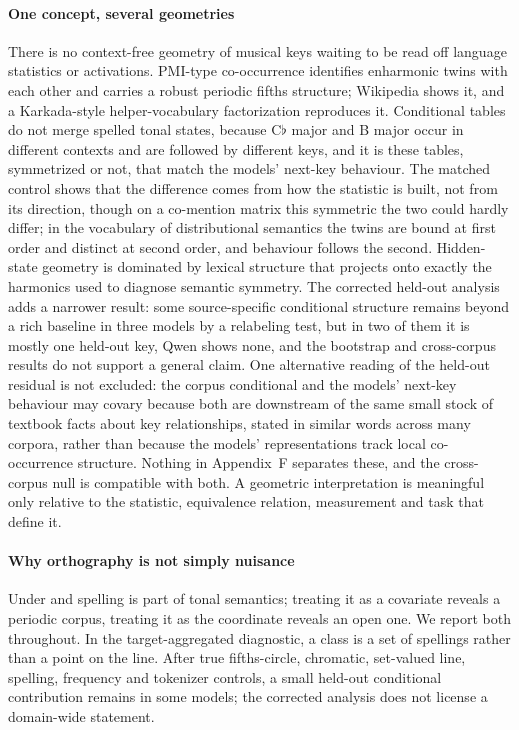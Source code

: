\documentclass[11pt]{article}
\newcommand{\fl}{$\flat$}
\begin{document}
\paragraph{One concept, several geometries} There is no context-free geometry of musical keys waiting to be read off language statistics or activations. PMI-type co-occurrence identifies enharmonic twins with each other and carries a robust periodic fifths structure; Wikipedia shows it, and a Karkada-style helper-vocabulary factorization reproduces it. Conditional tables do not merge spelled tonal states, because C\fl{} major and B major occur in different contexts and are followed by different keys, and it is these tables, symmetrized or not, that match the models' next-key behaviour. The matched control shows that the difference comes from how the statistic is built, not from its direction, though on a co-mention matrix this symmetric the two could hardly differ; in the vocabulary of distributional semantics the twins are bound at first order and distinct at second order, and behaviour follows the second. Hidden-state geometry is dominated by lexical structure that projects onto exactly the harmonics used to diagnose semantic symmetry. The corrected held-out analysis adds a narrower result: some source-specific conditional structure remains beyond a rich baseline in three models by a relabeling test, but in two of them it is mostly one held-out key, Qwen shows none, and the bootstrap and cross-corpus results do not support a general claim. One alternative reading of the held-out residual is not excluded: the corpus conditional and the models' next-key behaviour may covary because both are downstream of the same small stock of textbook facts about key relationships, stated in similar words across many corpora, rather than because the models' representations track local co-occurrence structure. Nothing in Appendix~F separates these, and the cross-corpus null is compatible with both. A geometric interpretation is meaningful only relative to the statistic, equivalence relation, measurement and task that define it.

\paragraph{Why orthography is not simply nuisance} Under \citet{temperley2000line} and \citet{moss2023line} spelling is part of tonal semantics; treating it as a covariate reveals a periodic corpus, treating it as the coordinate reveals an open one. We report both throughout. In the target-aggregated diagnostic, a class is a set of spellings rather than a point on the line. After true fifths-circle, chromatic, set-valued line, spelling, frequency and tokenizer controls, a small held-out conditional contribution remains in some models; the corrected analysis does not license a domain-wide statement.
\end{document}
